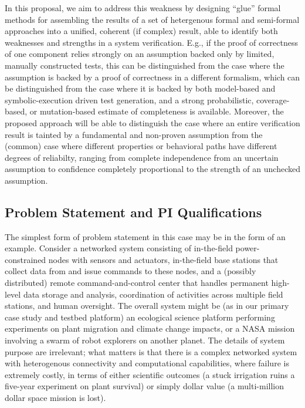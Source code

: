 In this proposal, we aim to address this weakness by designing
``glue'' formal methods for assembling the results of a set of
hetergenous formal and semi-formal approaches into a unified, coherent (if complex) result, able
to identify both weaknesses and strengths in a system verification.
E.g., if the proof of correctness of one component relies strongly on
an assumption backed only by limited, manually constructed tests, this
can be distinguished from the case where the assumption is backed by a
proof of correctness in a different formalism, which can be
distinguished from the case where it is backed by
both model-based and  symbolic-execution driven test generation, and
a strong probabilistic, coverage-based, or mutation-based estimate of completeness is
available.  Moreover, the proposed approach will be able to distinguish the case
where an entire verification result is tainted by a fundamental and non-proven
assumption from the (common) case where different properties or
behavioral paths have different degrees of reliabilty, ranging from
complete independence from an uncertain assumption to confidence
completely proportional to the strength of an unchecked assumption.


\subsection{Problem Statement and PI Qualifications}

The simplest form of problem statement in this case may be in the form
of an example.  Consider a networked system consisting of in-the-field
power-constrained 
nodes with sensors and actuators, in-the-field base stations that
collect data from and issue commands to these nodes, and a (possibly distributed) remote command-and-control center that handles
permanent high-level data storage and analysis, coordination of activities across
multiple field stations, and human oversight.  The overall system might be
(as in our primary case study and testbed platform) an ecological science 
platform performing experiments on plant migration and climate change
impacts, or a NASA mission involving a swarm of robot explorers on
another planet.  The details of system purpose are irrelevant; what
matters is that there is a complex networked system with heterogenous
connectivity and computational capabilities, where failure is
extremely costly, in terms of either scientific outcomes (a stuck
irrigation ruins a five-year experiment on plant survival) or simply
dollar value (a multi-million dollar space mission is lost).

